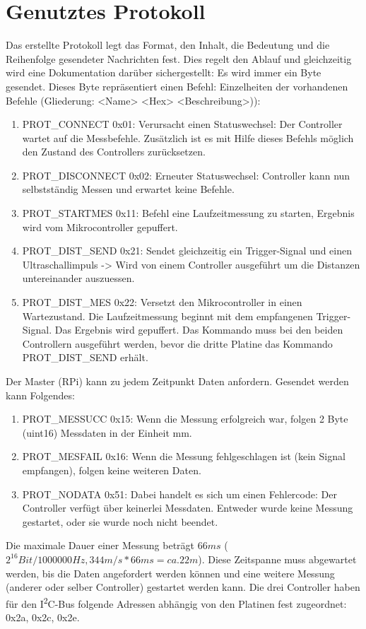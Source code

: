 \section{Genutztes Protokoll}
Das erstellte Protokoll legt das Format, den Inhalt, die Bedeutung und die Reihenfolge gesendeter Nachrichten fest. Dies regelt den Ablauf und gleichzeitig wird eine Dokumentation darüber sichergestellt:
Es wird immer ein Byte gesendet. Dieses Byte repräsentiert einen Befehl:
Einzelheiten der vorhandenen Befehle 
(Gliederung: <Name> <Hex> <Beschreibung>)):
\begin{enumerate}
	\item PROT\_CONNECT 0x01: Verursacht einen Statuswechsel: Der Controller wartet auf die Messbefehle. Zusätzlich ist es mit Hilfe dieses Befehls möglich den Zustand des Controllers zurücksetzen.
	\item PROT\_DISCONNECT 0x02: Erneuter Statuswechsel: Controller kann nun selbstständig Messen und erwartet keine Befehle.
	\item PROT\_STARTMES 0x11: Befehl eine Laufzeitmessung zu starten, Ergebnis wird vom Mikrocontroller gepuffert.
	\item PROT\_DIST\_SEND 0x21: Sendet gleichzeitig ein Trigger-Signal und einen Ultraschallimpuls -> Wird von einem Controller ausgeführt um die Distanzen untereinander auszuessen.
	\item PROT\_DIST\_MES 0x22: Versetzt den Mikrocontroller in einen Wartezustand. Die Laufzeitmessung beginnt mit dem empfangenen Trigger-Signal. Das Ergebnis wird gepuffert. Das Kommando muss bei den beiden Controllern ausgeführt werden, bevor die dritte Platine das Kommando PROT\_DIST\_SEND erhält.
\end{enumerate}
Der Master (RPi) kann zu jedem Zeitpunkt Daten anfordern. Gesendet werden kann Folgendes:
\begin{enumerate}
	\item PROT\_MESSUCC 0x15: Wenn die Messung erfolgreich war, folgen 2 Byte (uint16) Messdaten in der Einheit mm. 
	\item PROT\_MESFAIL 0x16: Wenn die Messung fehlgeschlagen ist (kein Signal empfangen), folgen keine weiteren Daten.
	\item PROT\_NODATA 0x51: Dabei handelt es sich um einen Fehlercode: Der Controller verfügt über keinerlei Messdaten. Entweder wurde keine Messung gestartet, oder sie wurde noch nicht beendet.
\end{enumerate}
Die maximale Dauer einer Messung beträgt $66 ms$ ($2^{16} Bit / 1000000 Hz, 344m/s * 66ms = ca. 22m$). Diese Zeitspanne muss abgewartet werden, bis die Daten angefordert werden können und eine weitere Messung (anderer oder selber Controller) gestartet werden kann. Die drei Controller haben für den I\textsuperscript{2}C-Bus folgende Adressen abhängig von den Platinen fest zugeordnet: 0x2a, 0x2c, 0x2e.

